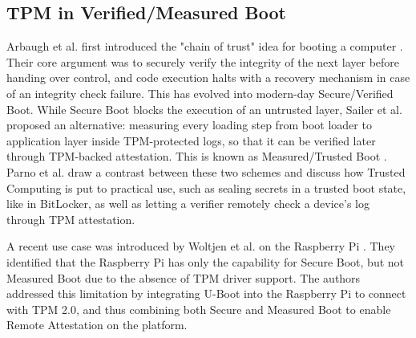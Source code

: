 \documentclass[letterpaper,twocolumn,10pt]{article}
\begin{document}
\subsection{TPM in Verified/Measured Boot}
Arbaugh et al. first introduced the "chain of trust" idea for booting a computer \cite{arbaugh1997secure}. Their core argument was to securely verify the integrity of the next layer before handing over control, and code execution halts with a recovery mechanism in case of an integrity check failure. This has evolved into modern-day Secure/Verified Boot. While Secure Boot blocks the execution of an untrusted layer, Sailer et al. proposed an alternative: measuring every loading step from boot loader to application layer inside TPM-protected logs, so that it can be verified later through TPM-backed attestation. This is known as Measured/Trusted Boot \cite{sailer2004design}. Parno et al. \cite{parno2010bootstrapping} draw a contrast between these two schemes and discuss how Trusted Computing is put to practical use, such as sealing secrets in a trusted boot state, like in BitLocker, as well as letting a verifier remotely check a device's log through TPM attestation.

A recent use case was introduced by Woltjen et al. on the Raspberry Pi \cite{woltjen2026trustworthy}. They identified that the Raspberry Pi has only the capability for Secure Boot, but not Measured Boot due to the absence of TPM driver support. The authors addressed this limitation by integrating U-Boot into the Raspberry Pi to connect with TPM 2.0, and thus combining both Secure and Measured Boot to enable Remote Attestation on the platform.




\end{document}
